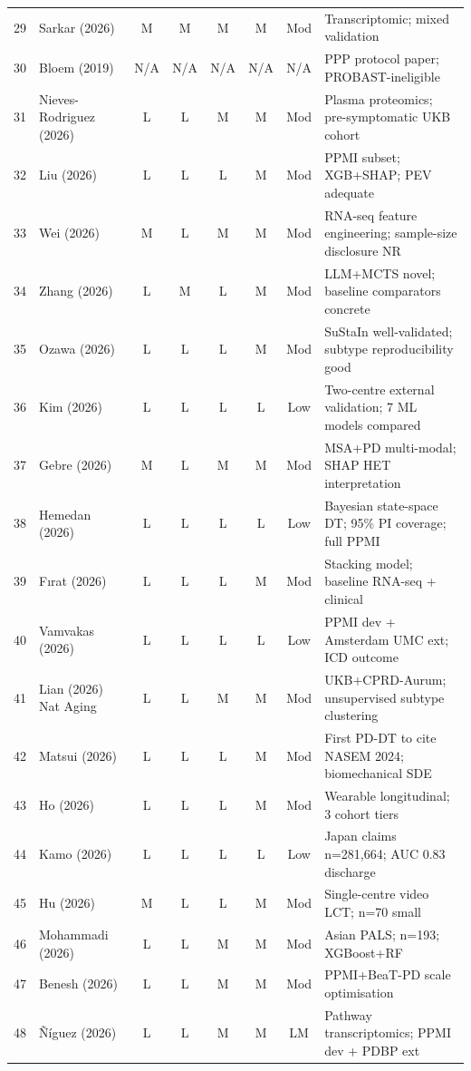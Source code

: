 \begin{longtable}{@{}cl ccccc p{5cm}@{}}
29 & Sarkar (2026)      & M & M & M & M & Mod  & Transcriptomic; mixed validation \\
30 & Bloem (2019)       & N/A & N/A & N/A & N/A & N/A & PPP protocol paper; PROBAST-ineligible \\
31 & Nieves-Rodriguez (2026) & L & L & M & M & Mod  & Plasma proteomics; pre-symptomatic UKB cohort \\
32 & Liu (2026)         & L & L & L & M & Mod  & PPMI subset; XGB+SHAP; PEV adequate \\
33 & Wei (2026)         & M & L & M & M & Mod  & RNA-seq feature engineering; sample-size disclosure NR \\
34 & Zhang (2026)       & L & M & L & M & Mod  & LLM+MCTS novel; baseline comparators concrete \\
35 & Ozawa (2026)       & L & L & L & M & Mod  & SuStaIn well-validated; subtype reproducibility good \\
36 & Kim (2026)         & L & L & L & L & Low  & Two-centre external validation; 7 ML models compared \\
37 & Gebre (2026)       & M & L & M & M & Mod  & MSA+PD multi-modal; SHAP HET interpretation \\
38 & Hemedan (2026)     & L & L & L & L & Low  & Bayesian state-space DT; 95\% PI coverage; full PPMI \\
39 & F\i{}rat (2026)    & L & L & L & M & Mod  & Stacking model; baseline RNA-seq + clinical \\
40 & Vamvakas (2026)    & L & L & L & L & Low  & PPMI dev + Amsterdam UMC ext; ICD outcome \\
41 & Lian (2026) Nat Aging & L & L & M & M & Mod  & UKB+CPRD-Aurum; unsupervised subtype clustering \\
42 & Matsui (2026)      & L & L & L & M & Mod  & First PD-DT to cite NASEM 2024; biomechanical SDE \\
43 & Ho (2026)          & L & L & L & M & Mod  & Wearable longitudinal; 3 cohort tiers \\
44 & Kamo (2026)        & L & L & L & L & Low  & Japan claims n=281{,}664; AUC 0.83 discharge \\
45 & Hu (2026)          & M & L & L & M & Mod  & Single-centre video LCT; n=70 small \\
46 & Mohammadi (2026)   & L & L & M & M & Mod  & Asian PALS; n=193; XGBoost+RF \\
47 & Benesh (2026)      & L & L & M & M & Mod  & PPMI+BeaT-PD scale optimisation \\
48 & \~{N}\'{i}guez (2026) & L & L & M & M & LM   & Pathway transcriptomics; PPMI dev + PDBP ext \\

\end{longtable}
